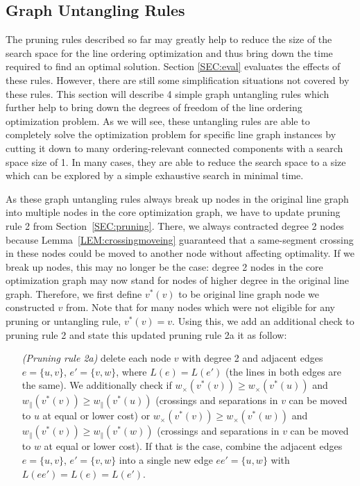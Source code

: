 \documentclass[format=acmsmall, review=false, screen=true]{acmart}
\begin{document}
\subsection{Graph Untangling Rules}\label{SEC:untangling}

The pruning rules described so far may greatly help to reduce the size of the search space for the line ordering optimization and thus bring down the time required to find an optimal solution. Section \ref{SEC:eval} evaluates the effects of these rules. However, there are still some simplification situations not covered by these rules. This section will describe 4 simple graph untangling rules which further help to bring down the degrees of freedom of the line ordering optimization problem. As we will see, these untangling rules are able to completely solve the optimization problem for specific line graph instances by cutting it down to many ordering-relevant connected components with a search space size of 1. In many cases, they are able to reduce the search space to a size which can be explored by a simple exhaustive search in minimal time.

As these graph untangling rules always break up nodes in the original line graph into multiple nodes in the core optimization graph, we have to update pruning rule 2 from Section~\ref{SEC:pruning}. There, we always contracted degree 2 nodes because Lemma~\ref{LEM:crossingmoveing} guaranteed that a same-segment crossing in these nodes could be moved to another node without affecting optimality. If we break up nodes, this may no longer be the case: degree 2 nodes in the core optimization graph may now stand for nodes of higher degree in the original line graph. Therefore, we first define $v^*(v)$ to be original line graph node we constructed $v$ from. Note that for many nodes which were not eligible for any pruning or untangling rule, $v^*(v) = v$. Using this, we add an additional check to pruning rule 2 and state this updated pruning rule 2a it as follow:
\begin{enumerate}[parsep=0.5mm, wide, labelwidth=0mm, itemindent=2.3mm]
  \setlength\itemsep{1pt}
  \item[\emph{(Pruning rule 2a)}] delete each node $v$ with degree 2 and adjacent edges $e = \{u, v\}$, $e' = \{v, w\}$,
  where 
  $L(e) = L(e')$ (the lines in both edges are the same). We additionally check if
  $w_\times(v^*(v)) \geq w_\times(v^*(u))$ and $w_\|(v^*(v)) \geq w_\|(v^*(u))$ (crossings and separations in $v$ can be moved to $u$ at equal or lower cost) 
  or
  $w_\times(v^*(v)) \geq w_\times(v^*(w))$ and $w_\|(v^*(v)) \geq w_\|(v^*(w))$ (crossings and separations in $v$ can be moved to $w$ at equal or lower cost). If that is the case, combine the adjacent edges $e = \{u, v\}$, $e' = \{v, w\}$ into a single new edge $ee' = \{u, w\}$ with $L(ee') = L(e) = L(e')$.
\end{enumerate}
\end{document}
